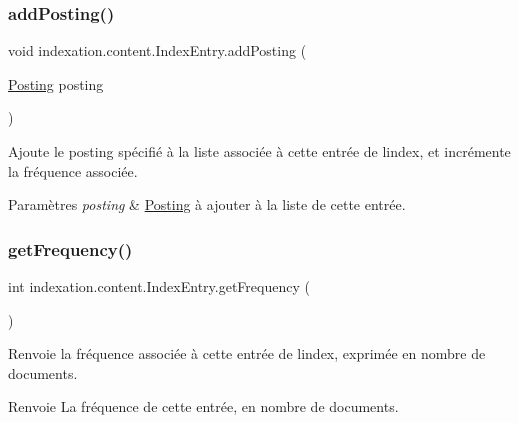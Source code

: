 \subsubsection{\texorpdfstring{add\+Posting()}{addPosting()}}
{\footnotesize\ttfamily void indexation.\+content.\+Index\+Entry.\+add\+Posting (\begin{DoxyParamCaption}\item[{\hyperlink{classindexation_1_1content_1_1Posting}{Posting}}]{posting }\end{DoxyParamCaption})}

Ajoute le posting spécifié à la liste associée à cette entrée de l\textquotesingle{}index, et incrémente la fréquence associée.


\begin{DoxyParams}{Paramètres}
{\em posting} & \hyperlink{classindexation_1_1content_1_1Posting}{Posting} à ajouter à la liste de cette entrée. \\
\hline
\end{DoxyParams}
\mbox{\label{classindexation_1_1content_1_1IndexEntry_a238cb00163e65a41cf34229ea11d1c15}} 
\subsubsection{\texorpdfstring{get\+Frequency()}{getFrequency()}}
{\footnotesize\ttfamily int indexation.\+content.\+Index\+Entry.\+get\+Frequency (\begin{DoxyParamCaption}{ }\end{DoxyParamCaption})}

Renvoie la fréquence associée à cette entrée de l\textquotesingle{}index, exprimée en nombre de documents.

\begin{DoxyReturn}{Renvoie}
La fréquence de cette entrée, en nombre de documents. 
\end{DoxyReturn}
\mbox{\label{classindexation_1_1content_1_1IndexEntry_abb6f82fd284de007234cbfb5c3c1ec13}} 
